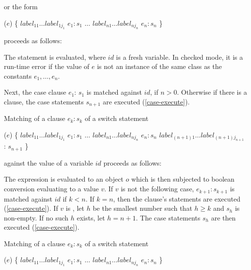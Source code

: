 \documentclass{article}
\begin{document}
or the form

\begin{dartCode}
\SWITCH{} ($e$) \{
   $label_{11} \ldots label_{1j_1}$ \CASE{} $e_1: s_1$
   $\ldots$
   $label_{n1} \ldots label_{nj_n}$ \CASE{} $e_n: s_n$
\}
\end{dartCode}

proceeds as follows:

\LMHash{}
The statement  is evaluated, where $id$ is a fresh variable.
In checked mode, it is a run-time error if the value of $e$ is not an instance of the same class as the constants $e_1, \ldots, e_n$.


\LMHash{}
Next, the case clause \CASE{} $e_{1}$: $s_{1}$ is matched against $id$, if $n > 0$.
Otherwise if there is a \DEFAULT{} clause, the case statements $s_{n+1}$ are executed (\ref{case-execute}).

\LMHash{}
Matching of a \CASE{} clause \CASE{} $e_{k}: s_{k}$ of a switch statement

\begin{dartCode}
\SWITCH{} ($e$) \{
   $label_{11} \ldots label_{1j_1}$ \CASE{} $e_1: s_1$
   $\ldots$
   $label_{n1} \ldots label_{nj_n}$ \CASE{} $e_n: s_n$
   $label_{(n+1)1} \ldots label_{(n+1)j_{n+1}}$ \DEFAULT{}: $s_{n+1}$
\}
\end{dartCode}

against the value of a variable $id$ proceeds as follows:

\LMHash{}
The expression  is evaluated to an object $o$ which is then subjected to boolean conversion evaluating to a value $v$.
If $v$ is not \TRUE{} the following case, \CASE{} $e_{k+1}: s_{k+1}$ is matched against $id$ if $k < n$.
If $k = n$, then the \DEFAULT{} clause's statements are executed (\ref{case-execute}).
If $v$ is \TRUE{}, let $h$ be the smallest number such that $h \ge k$ and $s_h$ is non-empty.
If no such $h$ exists, let $h = n + 1$.
The case statements $s_h$ are then executed (\ref{case-execute}).

\LMHash{}
Matching of a \CASE{} clause \CASE{} $e_{k}: s_{k}$ of a switch statement

\begin{dartCode}
\SWITCH{} ($e$) \{
   $label_{11} \ldots label_{1j_1}$ \CASE{} $e_1: s_1$
   $\ldots$
   $label_{n1} \ldots label_{nj_n}$ \CASE{} $e_n: s_n$
\}
\end{dartCode}
\end{document}
